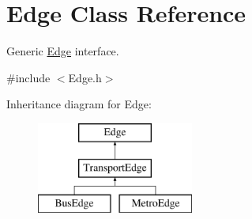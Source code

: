 \hypertarget{class_edge}{}\section{Edge Class Reference}
\label{class_edge}


Generic \hyperlink{class_edge}{Edge} interface.  




{\ttfamily \#include $<$Edge.\+h$>$}

Inheritance diagram for Edge\+:\begin{figure}[H]
\begin{center}
\leavevmode
\includegraphics[height=3.000000cm]{class_edge}
\end{center}
\end{figure}
